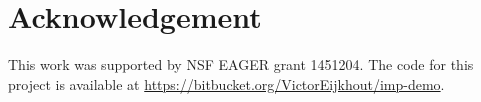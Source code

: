 \section*{Acknowledgement}

This work was supported by NSF EAGER grant 1451204.
The code for this project is available at \url{https://bitbucket.org/VictorEijkhout/imp-demo}.
